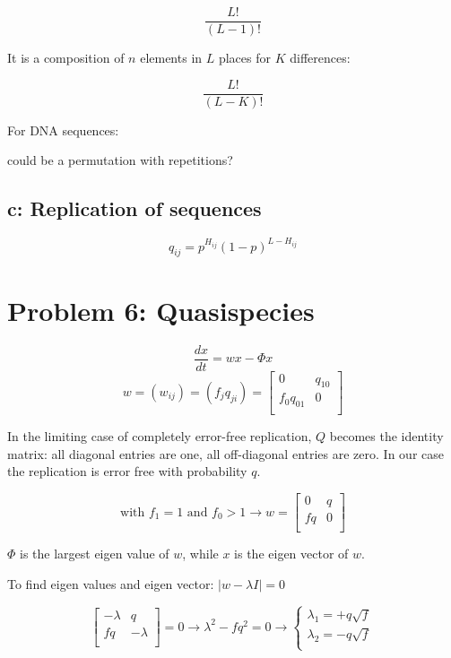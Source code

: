 \[  \frac{L!}{(L-1)!} \]

It is a composition of $n$ elements in $L$ places for $K$ differences:

\[  \frac{L!}{(L-K)!} \]

For DNA sequences:


could be a permutation with repetitions?

\subsection{c: Replication of sequences}
\begin{equation}
q_{ij} = p^{H_{ij}}(1-p)^{L-H_{ij}}
\end{equation}
\setcounter{chapter}{6}
\setcounter{section}{0}
\section{Problem 6: Quasispecies}

\[ \frac{dx}{dt} = wx - \varPhi x \] 
\[ w = (w_{ij}) = (f_{j}q_{ji}) = \begin{bmatrix}
       0 & q_{10}\\[0.3em]
       f_0q_{01} & 0 \\[0.3em]
     \end{bmatrix} \] 
     
In the limiting case of completely error-free replication, $Q$ becomes the identity matrix: all diagonal entries are one, all off-diagonal entries are zero. In our case the replication is error free with probability $q$.


\[ \text{with } f_1 = 1 \text{ and } f_0 > 1 \rightarrow w = \begin{bmatrix}
       0 & q\\[0.3em]
       fq & 0 \\[0.3em]
     \end{bmatrix} \] 
 
$\varPhi$ is the largest eigen value of $w$, while $x$ is the eigen vector of $w$.

To find eigen values and eigen vector: $ |w - \lambda I | = 0 $ 

\[ \begin{bmatrix}
       -\lambda & q\\[0.3em]
       fq & -\lambda \\[0.3em]
     \end{bmatrix} = 0 \rightarrow \lambda^2 - fq^2 = 0 \rightarrow \left\{ \begin{array}{l}
         \lambda_1 = +q\sqrt{f}\\
         \lambda_2 = -q\sqrt{f}\\
       \end{array} \right. \] 

